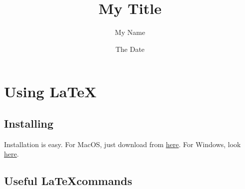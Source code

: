 \documentclass[onecolumn]{article}
\title{My Title}
\author{My Name}
\date{The Date}
\begin{document}
\maketitle
\tableofcontents
\newpage




\section{Using \LaTeX}

\subsection{Installing \LaTex}

Installation is easy. For MacOS, just download from \href{http://www.tug.org/mactex/}{here}. For Windows, look \href{http://www.howtotex.com/howto/installing-latex-on-windows/}{here}.

\subsection{Useful \LaTeX commands}
\end{document}
